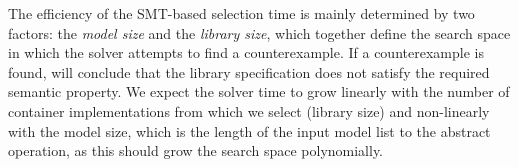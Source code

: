 The efficiency of the SMT-based selection time is mainly determined by two factors: the \emph{model size} and the \emph{library size}, which together define the search space in which the solver attempts to find a counterexample. If a counterexample is found, \Primrose{} will conclude that the library specification does not satisfy the required semantic property.
We expect the solver time to grow linearly with the number of container implementations from which we select (library size) and non-linearly with the model size, which is the length of the input model list to the abstract operation, as this should grow the search space polynomially.
